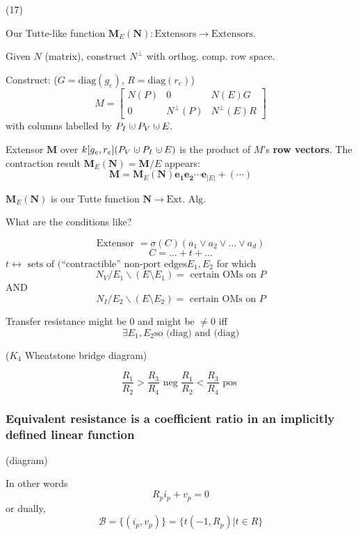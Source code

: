 \documentclass{beamer}
\newcommand{\dunion}
{\mbox{\hbox{\hskip0.45em$\cdot$\hskip-0.44em$\cup$\hskip0.2em}}}
\begin{document}
\begin{frame}{(17)}


Our Tutte-like function $\mathbf{M}_E(\mathbf{N}):\text{Extensors}\rightarrow\text{Extensors}$.

Given $N$ (matrix), construct $N^\perp$ 
with orthog. comp. row space.

Construct:  ($G=\mbox{diag}(g_e)$, $R=\mbox{diag}(r_e)$)
\[
M = \left[\begin{array}{c|c|c} N(P)  &  0  &  N(E)G \\  \hline
0  & N^{\perp}(P)  &  N^{\perp}(E)R \end{array}\right]
\]
with columns labelled by $P_I\dunion P_V\dunion E$.

Extensor $\mathbf{M}$ over $k[g_e, r_e](P_V\dunion P_I \dunion E)$
is the product of $M$'s \textbf{row vectors}. The contraction result
$\mathbf{M}_E(\mathbf{N}) = \mathbf{M}/E$ appears:
\[
\mathbf{M} = \mathbf{M}_E(\mathbf{N})\mathbf{e_1}\mathbf{e_2}\cdots\mathbf{e}_{|E|} + (\cdots) 
\]

$\mathbf{M}_E(\mathbf{N})$ is our Tutte function $\mathbf{N}\rightarrow \text{Ext. Alg.}$

\end{frame}



\begin{frame}{What are the conditions like?}

\[
\text{Extensor\ }= \sigma(C)(a_1\vee a_2\vee \ldots \vee a_d)
\]
\[
C = \ldots + t + \ldots
\]
$t \leftrightarrow \text{\ sets of (``contractible'' non-port edges} 
E_1, E_2$ for which
\[
N_V/E_1\backslash(E\setminus E_1) = \text{\ certain OMs on\ } P
\]
AND
\[
N_I/E_2\backslash(E\setminus E_2) = \text{\ certain OMs on\ } P
\]

Transfer resistance might be 0 and might be $\neq 0$ iff
\[
\exists E_1, E_2 \text{so (diag) and (diag)}
\]

($K_4$ Wheatstone bridge diagram)

\[
\frac{R_1}{R_2} > \frac{R_3}{R_4} 
\text{\ neg\ }
\frac{R_1}{R_2} < \frac{R_3}{R_4} 
\text{\ pos\ }
\]

\end{frame}


\begin{frame}
\frametitle{Equivalent resistance is a coefficient ratio in an 
implicitly defined linear function}

(diagram)

In other words
\[
R_pi_p + v_p = 0
\]
or dually,
\[
\mathcal{B} = \{(i_p,v_p)\}
= \{ t(-1, R_p) | t\in R\}
\]

\end{frame}
\end{document}
